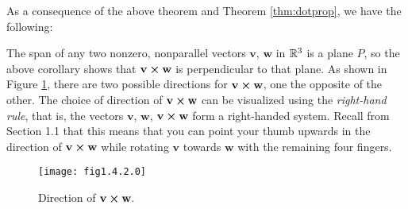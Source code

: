 As a consequence of the above theorem and Theorem \ref{thm:dotprop}, we have the following:


The span of any two nonzero, nonparallel vectors $\mathbf{v}$, $\mathbf{w}$ in $\mathbb{R}^{3}$ is a plane $P$, so the above
corollary shows that $\mathbf{v} \bm{\times} \mathbf{w}$ is perpendicular to that plane. 
As shown in
Figure \ref{fig:crossnormal}, there are two possible directions for $\mathbf{v} \bm{\times} \mathbf{w}$, one the
opposite of the other.
The choice of direction of $\mathbf{v} \bm{\times} \mathbf{w}$ can be visualized using the \emph{right-hand rule}, that is, the vectors $\mathbf{v}$, $\mathbf{w}$,
$\mathbf{v} \bm{\times} \mathbf{w}$ form a right-handed system. 
Recall from Section 1.1 that this means that
you can point your thumb upwards in the direction of $\mathbf{v} \bm{\times} \mathbf{w}$
while rotating $\mathbf{v}$ towards $\mathbf{w}$ with the remaining four fingers.

\begin{figure}[h]
 \begin{center}
  \texttt{[image: fig1.4.2.0]}
 \end{center}
 \caption[]{\quad Direction of $\mathbf{v} \bm{\times} \mathbf{w}$.}
 \label{fig:crossnormal}
\end{figure}

